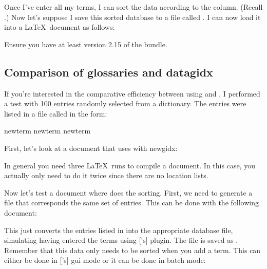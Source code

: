 \begin{example}
   Once I've enter all my terms, I can sort the data according to 
   the  column. (Recall .)
   Now let's suppose I save this sorted database to a file
   called . I can now load it into 
   a \LaTeX\ document as follows:


Ensure you have at least version 2.15 of the  bundle.
\end{example}

\subsection{Comparison of glossaries and datagidx}\label{sec:comparison}

   If you're interested in the comparative efficiency between
   using  and , I performed
   a test with 100 entries randomly selected from a dictionary.
   The entries were listed in a file called  in
   the form:

\begin{codebox}
\gls{newterm}
\gls{newterm}
\gls{newterm}
\end{codebox}

   First, let's look at a document that uses  with \gls{newgidx}:



   In general you need three \LaTeX\ runs to compile a 
   document. In this case, you actually only need to do it twice
   since there are no location lists.


   Now let's test a  document where  does the
   sorting. First, we need to generate a 
   file that corresponds the same set of entries. This can be done
   with the following document:



   This just converts the entries listed in 
   into the appropriate database file, simulating having entered
   the terms using ['s]  plugin. The file is saved
   as . Remember that this data only needs
   to be sorted when you add a term. This can either be done
   in ['s] \gls{gui} mode or it can be done in batch mode:


